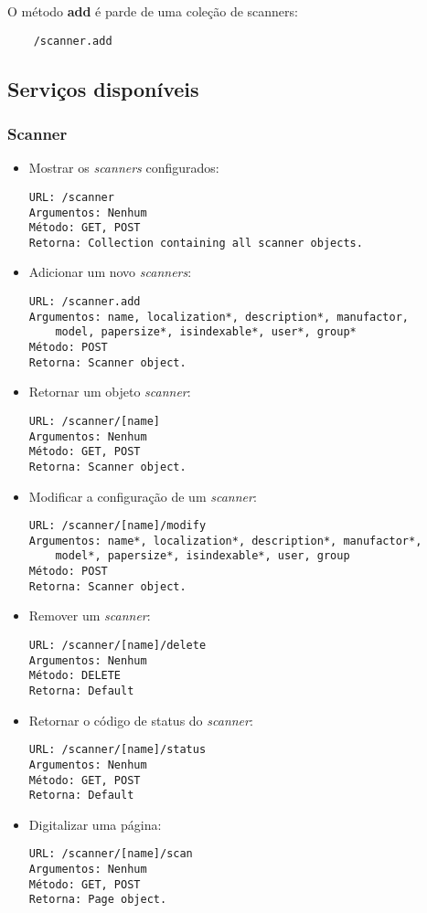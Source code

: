 O método {\bf add} é parde de uma coleção de scanners:
\begin{verbatim}
    /scanner.add
\end{verbatim}

\subsection{Serviços disponíveis}
\label{sec:servicos_disponiveis}

\subsubsection{Scanner}

\begin{itemize}

\item Mostrar os {\it scanners} configurados:
\begin{verbatim}
URL: /scanner
Argumentos: Nenhum
Método: GET, POST
Retorna: Collection containing all scanner objects.
\end{verbatim}

\item Adicionar um novo {\it scanners}:
\begin{verbatim}
URL: /scanner.add
Argumentos: name, localization*, description*, manufactor, 
    model, papersize*, isindexable*, user*, group*
Método: POST
Retorna: Scanner object.
\end{verbatim}

\item Retornar um objeto {\it scanner}:
\begin{verbatim}
URL: /scanner/[name]
Argumentos: Nenhum
Método: GET, POST
Retorna: Scanner object.
\end{verbatim}

\item Modificar a configuração de um {\it scanner}:
\begin{verbatim}
URL: /scanner/[name]/modify
Argumentos: name*, localization*, description*, manufactor*, 
    model*, papersize*, isindexable*, user, group
Método: POST
Retorna: Scanner object.
\end{verbatim}

\item Remover um {\it scanner}:
\begin{verbatim}
URL: /scanner/[name]/delete
Argumentos: Nenhum
Método: DELETE
Retorna: Default
\end{verbatim}

\item Retornar o código de status do {\it scanner}:
\begin{verbatim}
URL: /scanner/[name]/status
Argumentos: Nenhum
Método: GET, POST
Retorna: Default
\end{verbatim}

\item Digitalizar uma página:
\begin{verbatim}
URL: /scanner/[name]/scan
Argumentos: Nenhum
Método: GET, POST
Retorna: Page object.
\end{verbatim}

\end{itemize}

